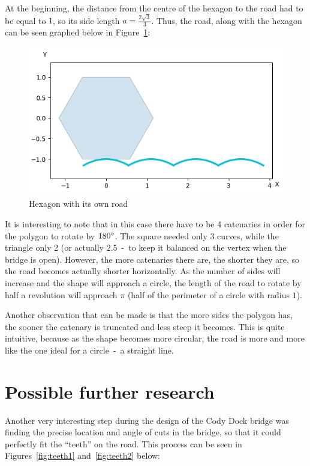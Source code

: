 \documentclass[12pt]{article}
\begin{document}
        At the beginning, the distance from the centre of the hexagon to the road had to be equal to $1$, so its side length $a=\frac{2\sqrt{3}}{3}$. Thus, the road, along with the hexagon can be seen graphed below in Figure~\ref{fig:hexagon}:
        \begin{figure}[H]
            \centering
            \includegraphics[width=0.8\linewidth]{images/hexagon_bridge.png}
            \caption{Hexagon with its own road}\label{fig:hexagon}
        \end{figure}

        It is interesting to note that in this case there have to be 4 catenaries in order for the polygon to rotate by $180\degree$. The square needed only 3 curves, while the triangle only 2 (or actually $2.5$~-~to keep it balanced on the vertex when the bridge is open). However, the more catenaries there are, the shorter they are, so the road becomes actually shorter horizontally. As the number of sides will increase and the shape will approach a circle, the length of the road to rotate by half a revolution will approach $\pi$ (half of the perimeter of a circle with radius $1$).

        Another observation that can be made is that the more sides the polygon has, the sooner the catenary is truncated and less steep it becomes. This is quite intuitive, because as the shape becomes more circular, the road is more and more like the one ideal for a circle~-~a straight line.

    \section{Possible further research}

        Another very interesting step during the design of the Cody Dock bridge was finding the precise location and angle of cuts in the bridge, so that it could perfectly fit the ``teeth'' on the road. This process can be seen in Figures~\ref{fig:teeth1} and~\ref{fig:teeth2} below:
\end{document}
